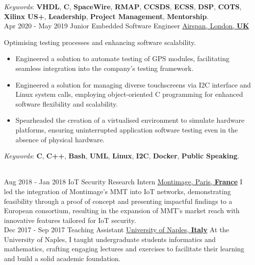 \documentclass[letterpaper]{twentysecondcv} %
\begin{document}
\begin{twenty}
{            \vspace{1 mm}
            \textit{Keywords}: \textbf{VHDL}, \textbf{C}, \textbf{SpaceWire}, \textbf{RMAP}, \textbf{CCSDS}, \textbf{ECSS}, \textbf{DSP}, \textbf{COTS}, \textbf{Xilinx US+}, \textbf{Leadership}, \textbf{Project Management}, \textbf{Mentorship}.
        }\\
    \twentyitem
    	{Apr 2020 -}
		{May 2019}
        {Junior Embedded Software Engineer}
        {\href{https://www.airspan.com/}{Airspan, London, \textbf{UK}}}
        {}
        {
            Optimising testing processes and enhancing software scalability.
            \vspace{1 mm}
            \begin{itemize}
                \item Engineered a solution to automate testing of GPS modules, facilitating seamless integration into the company's testing framework.
                \item Engineered a solution for managing diverse touchscreens via I2C interface and Linux system calls, employing object-oriented C programming for enhanced software flexibility and scalability.
                \item Spearheaded the creation of a virtualised environment to simulate hardware platforms, ensuring uninterrupted application software testing even in the absence of physical hardware.
            \end{itemize}

            \vspace{1 mm}
            \textit{Keywords}: \textbf{C}, \textbf{C++}, \textbf{Bash}, \textbf{UML}, \textbf{Linux}, \textbf{I2C}, \textbf{Docker}, \textbf{Public Speaking}.
        }\\
    \twentyitem
        {Aug 2018 -}
    	{Jan 2018}
        {IoT Security Research Intern}
        {\href{https://www.montimage.com/}{Montimage, Paris, \textbf{France}}}
        {}
        {
            I led the integration of Montimage's MMT into IoT networks, demonstrating feasibility through a proof of concept and presenting impactful findings to a European consortium, resulting in the expansion of MMT's market reach with innovative features tailored for IoT security.
        }\\
    \twentyitem
        {Dec 2017 -}
  		{Sep 2017}
        {Teaching Assistant}
        {\href{http://www.scuolapsb.unina.it/}{University of Naples, \textbf{Italy}}}
        {}
        {
            At the University of Naples, I taught undergraduate students informatics and mathematics, crafting engaging lectures and exercises to facilitate their learning and build a solid academic foundation.
        }
\end{twenty}
\end{document}
